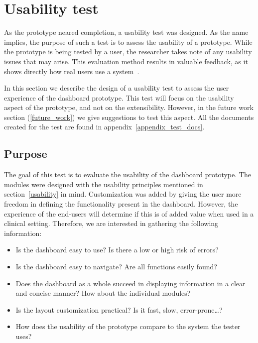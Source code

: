 \section{Usability test}\label{usabilitytest}

As the prototype neared completion, a usability test was designed. As the name implies, the purpose of such a test is to assess the usability of a prototype. While the prototype is being tested by a user, the researcher takes note of any usability issues that may arise. This evaluation method results in valuable feedback, as it shows directly how real users use a system~\cite{Nielsen1993, Lazar2017}.

In this section we describe the design of a usability test to assess the user experience of the dashboard prototype. This test will focus on the usability aspect of the prototype, and not on the extensibility. However, in the future work section (\ref{future_work}) we give suggestions to test this aspect. All the documents created for the test are found in appendix~\ref{appendix_test_docs}.

    \subsection{Purpose}

    The goal of this test is to evaluate the usability of the dashboard prototype. The modules were designed with the usability principles mentioned in section~\ref{usability} in mind. Customization was added by giving the user more freedom in defining the functionality present in the dashboard. However, the experience of the end-users will determine if this is of added value when used in a clinical setting. Therefore, we are interested in gathering the following information:
    \begin{itemize}
        \item Is the dashboard easy to use? Is there a low or high risk of errors?
        \item Is the dashboard easy to navigate? Are all functions easily found?
        \item Does the dashboard as a whole succeed in displaying information in a clear and concise manner? How about the individual modules?
        \item Is the layout customization practical? Is it fast, slow, error-prone\ldots?
        \item How does the usability of the prototype compare to the system the tester uses?
    \end{itemize}

